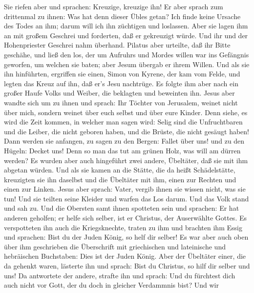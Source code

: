  Sie riefen aber und sprachen: Kreuzige, kreuzige ihn!
 Er aber sprach zum drittenmal zu ihnen: Was hat denn
dieser Übles getan? Ich finde keine Ursache des Todes an ihm; darum will
ich ihn züchtigen und loslassen.  Aber sie lagen ihm an mit
großem Geschrei und forderten, daß er gekreuzigt würde. Und ihr und der
Hohenpriester Geschrei nahm überhand.  Pilatus aber
urteilte, daß ihr Bitte geschähe,  und ließ den los, der um
Aufruhrs und Mordes willen war ins Gefängnis geworfen, um welchen sie
baten; aber Jesum übergab er ihrem Willen.  Und als sie ihn
hinführten, ergriffen sie einen, Simon von Kyrene, der kam vom Felde,
und legten das Kreuz auf ihn, daß er's Jesu nachtrüge.  Es
folgte ihm aber nach ein großer Haufe Volks und Weiber, die beklagten
und beweinten ihn.  Jesus aber wandte sich um zu ihnen und
sprach: Ihr Töchter von Jerusalem, weinet nicht über mich, sondern
weinet über euch selbst und über eure Kinder.  Denn siehe,
es wird die Zeit kommen, in welcher man sagen wird: Selig sind die
Unfruchtbaren und die Leiber, die nicht geboren haben, und die Brüste,
die nicht gesäugt haben!  Dann werden sie anfangen, zu
sagen zu den Bergen: Fallet über uns! und zu den Hügeln: Decket uns!
 Denn so man das tut am grünen Holz, was will am dürren
werden?  Es wurden aber auch hingeführt zwei andere,
Übeltäter, daß sie mit ihm abgetan würden.  Und als sie
kamen an die Stätte, die da heißt Schädelstätte, kreuzigten sie ihn
daselbst und die Übeltäter mit ihm, einen zur Rechten und einen zur
Linken.  Jesus aber sprach: Vater, vergib ihnen sie wissen
nicht, was sie tun! Und sie teilten seine Kleider und warfen das Los
darum.  Und das Volk stand und sah zu. Und die Obersten
samt ihnen spotteten sein und sprachen: Er hat anderen geholfen; er
helfe sich selber, ist er Christus, der Auserwählte Gottes.
 Es verspotteten ihn auch die Kriegsknechte, traten zu ihm
und brachten ihm Essig  und sprachen: Bist du der Juden
König, so helf dir selber!  Es war aber auch oben über ihm
geschrieben die Überschrift mit griechischen und lateinische und
hebräischen Buchstaben: Dies ist der Juden König.  Aber der
Übeltäter einer, die da gehenkt waren, lästerte ihn und sprach: Bist du
Christus, so hilf dir selber und uns!  Da antwortete der
andere, strafte ihn und sprach: Und du fürchtest dich auch nicht vor
Gott, der du doch in gleicher Verdammnis bist?  Und wir
